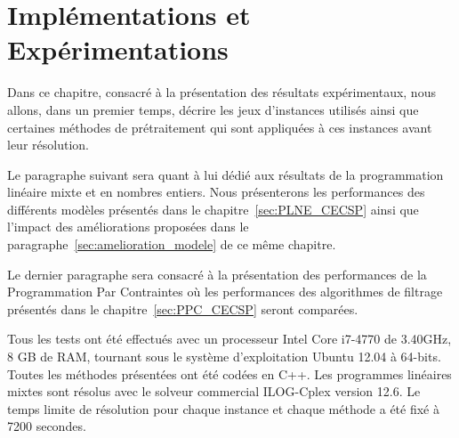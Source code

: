 \chapter{Implémentations et Expérimentations}

Dans ce chapitre, consacré à la présentation des résultats
expérimentaux, nous allons, dans un premier temps, décrire les
jeux d'instances utilisés ainsi que certaines méthodes de
prétraitement qui sont appliquées à ces instances avant leur
résolution. 

Le paragraphe suivant sera quant à lui dédié aux résultats de la
programmation linéaire mixte et en nombres entiers. Nous présenterons
les performances des différents modèles présentés dans le
chapitre~\ref{sec:PLNE_CECSP} ainsi que l'impact des améliorations
proposées dans le paragraphe~\ref{sec:amelioration_modele} de ce même
chapitre. 

Le dernier paragraphe sera consacré à la présentation des performances
de la Programmation Par Contraintes où les performances des
algorithmes de filtrage présentés dans le chapitre~\ref{sec:PPC_CECSP}
seront comparées. 

Tous les tests ont été effectués avec un processeur Intel Core i7-4770
de 3.40GHz, 8 GB de RAM, tournant sous le système d’exploitation
Ubuntu 12.04 à 64-bits. Toutes les méthodes présentées ont été codées
en C++. Les programmes linéaires mixtes sont résolus avec le solveur
commercial ILOG-Cplex version 12.6. Le temps limite de résolution pour
chaque instance et chaque méthode a été fixé à 7200 secondes.










